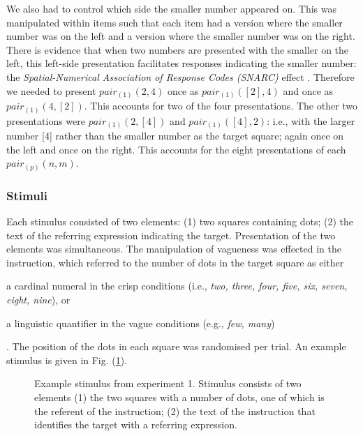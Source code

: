 \documentclass[man,floatmark]{apa}
\begin{document}
We also had to control which side the smaller number appeared on. This was manipulated within items such that each item had a version where the smaller number was on the left and a version where the smaller number was on the right. There is evidence  that when two numbers are presented with the smaller on the left, this left-side presentation facilitates responses indicating the smaller number: the \emph{Spatial-Numerical Association of Response Codes (SNARC)} effect \cite{dehaene1993mental, gevers2006automatic}. Therefore we needed to present $pair_{(1)}(2,4)$ once as $pair_{(1)}([2],4)$ and once as $pair_{(1)}(4,[2])$. This accounts for two of the four presentations. The other two presentations were $pair_{(1)}(2,[4])$ and $pair_{(1)}([4],2)$: i.e., with the larger number [4] rather than the smaller number as the target square; again once on the left and once on the right. This accounts for the eight presentations of each $pair_{(p)}(n,m)$.

\subsubsection{Stimuli}
Each stimulus consisted of two elements: (1) two squares containing dots; (2) the text of the referring expression indicating the target. Presentation of the two elements was simultaneous. The manipulation of vagueness was effected in the instruction, which referred to the number of dots in the target square as either \begin{seriate} \item a cardinal numeral in the crisp conditions (i.e., \emph{two, three, four, five, six, seven, eight, nine}), or \item a linguistic quantifier in the vague conditions (e.g., \emph{few, many}) \end{seriate}. The position of the dots in each square was randomised per trial. An example stimulus is given in Fig. (\ref{stime1}).

\begin{figure}[tbp]
\caption{Example stimulus from experiment 1. Stimulus consists of two elements (1) the two squares with a number of dots, one of which is the referent of the instruction; (2) the text of the instruction that identifies the target with a referring expression.}
\label{stime1}
\end{figure}
\end{document}

